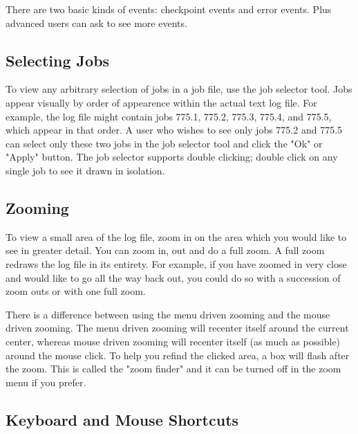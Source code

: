 There are two basic kinds of events: checkpoint events and error events.   Plus advanced users can ask to see more events. 


\subsection{\label{sec:job-selector}Selecting Jobs}

To view any arbitrary selection of jobs in a job file, use the job selector tool.  Jobs appear visually by order of appearence within the actual text log file.  For example, the log file might contain jobs
775.1, 775.2, 775.3, 775.4, and 775.5, which appear in that order.  A user who wishes to see only jobs 775.2 and 775.5 can select only these two jobs in the job selector tool and click the "Ok" or
"Apply" button.  The job selector supports double clicking; double
click on any single job to see it drawn in isolation. 

\subsection{\label{sec:zooming}Zooming}

To view a small area of the log file, zoom in on the area which you would like to see in greater detail. You can zoom in, out and do a full zoom. A full zoom redraws the log file in its entirety. For
example, if you have zoomed in very close and would like to go all the way back out, you could do so with a succession of zoom outs or with one full zoom. 

There is a difference between using the menu driven zooming and the mouse driven zooming. The menu driven zooming will recenter itself around the current center, whereas mouse driven
zooming will recenter itself (as much as possible) around the mouse click. To help you refind the clicked area, a box will flash after the zoom. This is called the "zoom finder" and it can be turned
off in the zoom menu if you prefer. 

\subsection{\label{sec:k-m-shortcuts}Keyboard and Mouse Shortcuts}


